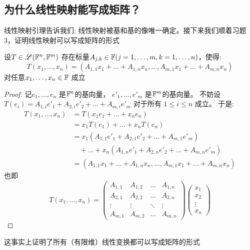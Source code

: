 \subsection{为什么线性映射能写成矩阵？}
线性映射引理告诉我们: 线性映射被基和基的像唯一确定。接下来我们顺着习题3，证明线性映射可以写成矩阵的形式
\begin{theorem}
    设\(T \in \mathscr{L}(\mathbb{F}^{n},\mathbb{F}^{m})\)
    存在标量\(A_{j,k} \in
    \mathbb{F} (j = 1, \dots ,m, k=1, \dots, n) \)，使得:
    \[
        T(x_{1},\dots,x_{n})=(A_{1,1}x_{1}+\dots+A_{1,n}x_{n},\dots,A_{m,1}x_{1}+\dots+A_{m,n}x_{n})
    \]
    对任意\(x_{1},\dots,x_{n} \in \mathbb{F}\) 成立
\end{theorem}

\begin{proof}
    记\(e_{1}, \dots, e_{n}\) 是\(\mathbb{F}^{n}\)的基向量，
    \(e'_{1}, \dots, e'_{m}\)
    是\(\mathbb{F}^{m}\)的基向量。
    不妨设 \(T(e_{i}) = A_{1,i}e'_{1} +
        A_{2,i}e'_{2} + \dots +
    A_{m,i}e'_{m}\) 对于所有 \(1\leq i\leq n\) 成立。
    于是:
    \begin{align*}
        T(x_{1},\dots,x_{n}) &= T(x_{1}e_{1} + \dots +
        x_{n}e_{n})\\
        &= x_{1}T(e_{1}) + \dots + x_{n}T(e_{n})\\
        &= x_{1}(A_{1,1}e'_{1} + A_{2,1}e'_{2} +
        \dots + A_{m,1}e'_{m}) \nonumber \\
        &\quad + \dots +
        x_{n}(A_{1,n}e'_{1} + A_{2,n}e'_{2} +
        \dots + A_{m,n}e'_{m})\\    &=
        (A_{1,1}x_{1}+\dots+A_{1,n}x_{n},\dots,A_{m,1}x_{1}+\dots+A_{m,n}x_{n})
    \end{align*}
    也即\[
        T(x_1, \dots, x_n) =
        \begin{pmatrix}
            A_{1,1} & A_{1,2} & \dots & A_{1,n} \\
            A_{2,1} & A_{2,2} & \dots & A_{2,n} \\
            \vdots  & \vdots  & \ddots & \vdots  \\
            A_{m,1} & A_{m,2} & \dots & A_{m,n}
        \end{pmatrix}
        \begin{pmatrix}
            x_1 \\
            x_2 \\
            \vdots \\
            x_n
        \end{pmatrix}
    \]
\end{proof}
这事实上证明了所有（有限维）线性变换都可以写成矩阵的形式

